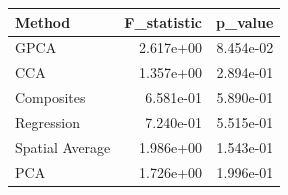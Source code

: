 \begin{tabular}{lrr}
\toprule
Method & F_statistic & p_value \\
\midrule
GPCA & 2.617e+00 & 8.454e-02 \\
CCA & 1.357e+00 & 2.894e-01 \\
Composites & 6.581e-01 & 5.890e-01 \\
Regression & 7.240e-01 & 5.515e-01 \\
Spatial Average & 1.986e+00 & 1.543e-01 \\
PCA & 1.726e+00 & 1.996e-01 \\
\bottomrule
\end{tabular}
